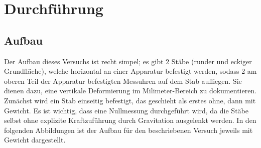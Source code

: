 \section{Durchführung}
\label{sec:Durchführung}

\subsection{Aufbau}
Der Aufbau dieses Versuchs ist recht simpel; es gibt 2 Stäbe (runder und eckiger
Grundfläche), welche horizontal an einer Apparatur befestigt werden, sodass
2 am oberen Teil der Apparatur befestigten Messuhren auf dem Stab aufliegen.
Sie dienen dazu, eine vertikale Deformierung im Milimeter-Bereich zu dokumentieren.
Zunächst wird ein Stab einseitig befestigt, das geschieht als erstes ohne,
dann mit Gewicht. Es ist wichtig, dass eine Nullmessung durchgeführt wird, da 
die Stäbe selbst ohne explizite Kraftzuführung durch Gravitation ausgelenkt werden.
In den folgenden Abbildungen ist der Aufbau für den beschriebenen Versuch jeweils 
mit Gewicht dargestellt. \\
\\
\\
\\
\\
\\
\\
\\
